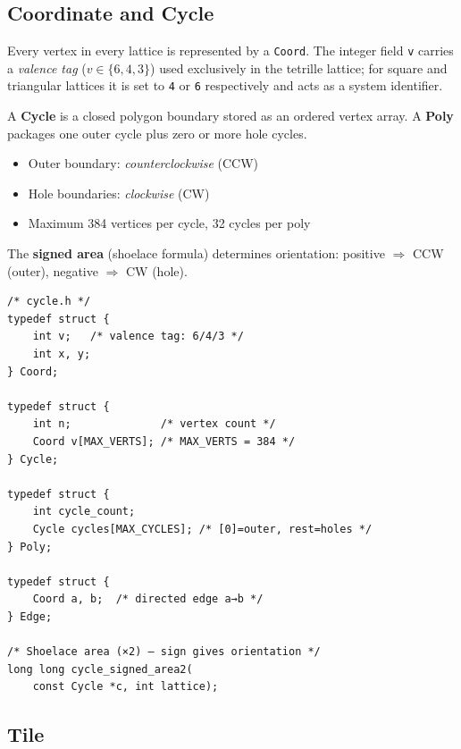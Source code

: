 \documentclass[10pt,a4paper]{article}
\let\polysubsection\subsection
\renewcommand\subsection{\needspace{0.12\textheight}\polysubsection}
\newcommand{\code}[1]{\texttt{\small #1}}
\newcommand{\file}[1]{\texttt{\footnotesize #1}}
\begin{document}
\subsection{Coordinate and Cycle}

\begin{tcolorbox}[dualbox, title={Coordinate, Cycle, Poly, Edge --- \file{src/core/cycle.h}}]
  Every vertex in every lattice is represented by a \code{Coord}.
  The integer field \code{v} carries a \emph{valence tag}
  ($v \in \{6, 4, 3\}$) used exclusively in the tetrille lattice;
  for square and triangular lattices it is set to \code{4} or
  \code{6} respectively and acts as a system identifier.

  A \textbf{Cycle} is a closed polygon boundary stored as an ordered
  vertex array.  A \textbf{Poly} packages one outer cycle plus zero or
  more hole cycles.

  \begin{itemize}
    \item Outer boundary: \emph{counterclockwise} (CCW)
    \item Hole boundaries: \emph{clockwise} (CW)
    \item Maximum 384 vertices per cycle, 32 cycles per poly
  \end{itemize}

  The \textbf{signed area} (shoelace formula) determines orientation:
  positive $\Rightarrow$ CCW (outer), negative $\Rightarrow$ CW (hole).
\tcblower
\begin{verbatim}
/* cycle.h */
typedef struct {
    int v;   /* valence tag: 6/4/3 */
    int x, y;
} Coord;

typedef struct {
    int n;              /* vertex count */
    Coord v[MAX_VERTS]; /* MAX_VERTS = 384 */
} Cycle;

typedef struct {
    int cycle_count;
    Cycle cycles[MAX_CYCLES]; /* [0]=outer, rest=holes */
} Poly;

typedef struct {
    Coord a, b;  /* directed edge a→b */
} Edge;

/* Shoelace area (×2) — sign gives orientation */
long long cycle_signed_area2(
    const Cycle *c, int lattice);
\end{verbatim}
\end{tcolorbox}

\subsection{Tile}
\end{document}
